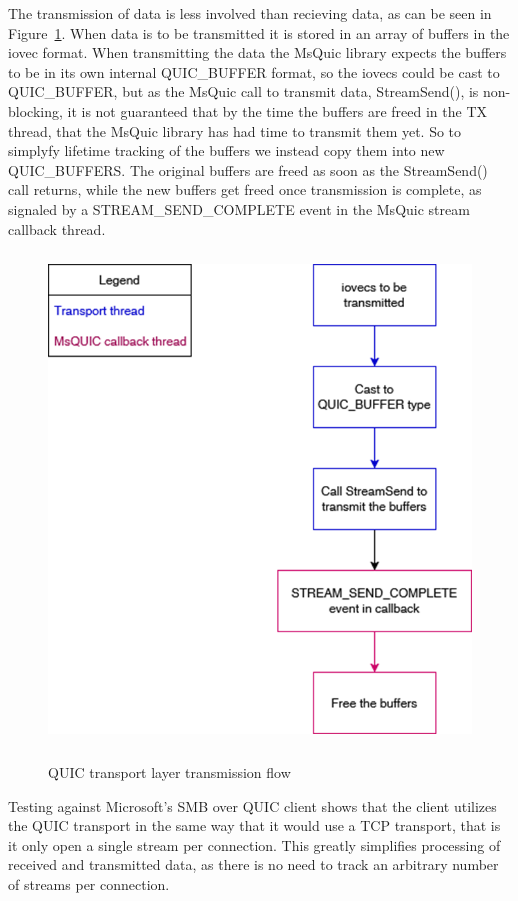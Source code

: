 \documentclass[english, 12pt, a4paper, elec, utf8, a-2b, online]{aaltothesis}
\begin{document}
The transmission of data is less involved than recieving data, as can be seen
in Figure~\ref{fig:msquic_tx}. When data is to be transmitted it is stored in
an array of buffers in the iovec format. When transmitting the data the MsQuic
library expects the buffers to be in its own internal QUIC\_BUFFER format,
so the iovecs could be cast to QUIC\_BUFFER, but as the MsQuic call to transmit
data, StreamSend(), is non-blocking, it is not guaranteed that by the time the buffers
are freed in the TX thread, that the MsQuic library has had time to transmit them yet.
So to simplyfy lifetime tracking of the buffers we instead copy them into new QUIC\_BUFFERS.
The original buffers are freed as soon as the StreamSend() call returns, while the new
buffers get freed once transmission is complete, as signaled by a STREAM\_SEND\_COMPLETE
event in the MsQuic stream callback thread.
\begin{figure}[h]
	\centering
	\includegraphics[alt={Block diagram of the flow when sending data using the MsQuic library}, height=13cm]{./images/send_flow.png}
	\caption{QUIC transport layer transmission flow}
	\label{fig:msquic_tx}
\end{figure}

Testing against Microsoft's SMB over QUIC client shows that the client utilizes the
QUIC transport in the same way that it would use a TCP transport, that is it only
open a single stream per connection. This greatly simplifies processing of received
and transmitted data, as there is no need to track an arbitrary number of streams
per connection.
\end{document}
